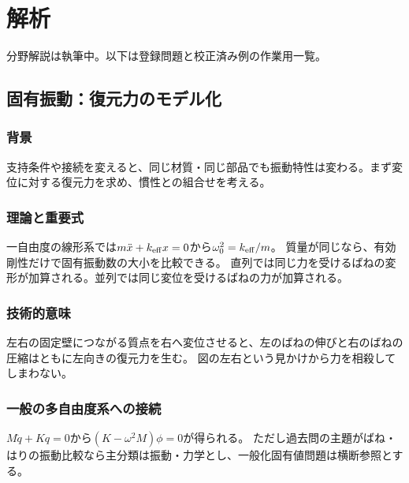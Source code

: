 \chapter{解析}
\noindent 分野解説は執筆中。以下は登録問題と校正済み例の作業用一覧。
\section{固有振動：復元力のモデル化}
\subsection{背景}
支持条件や接続を変えると、同じ材質・同じ部品でも振動特性は変わる。まず変位に対する復元力を求め、慣性との組合せを考える。
\subsection{理論と重要式}
一自由度の線形系では$m\ddot{x}+k_{\rm eff}x=0$から$\omega_0^2=k_{\rm eff}/m$。
質量が同じなら、有効剛性だけで固有振動数の大小を比較できる。
直列では同じ力を受けるばねの変形が加算される。並列では同じ変位を受けるばねの力が加算される。
\subsection{技術的意味}
左右の固定壁につながる質点を右へ変位させると、左のばねの伸びと右のばねの圧縮はともに左向きの復元力を生む。
図の左右という見かけから力を相殺してしまわない。
\subsection{一般の多自由度系への接続}
$M\ddot{q}+Kq=0$から$(K-\omega^2M)\phi=0$が得られる。
ただし過去問の主題がばね・はりの振動比較なら主分類は振動・力学とし、一般化固有値問題は横断参照とする。


